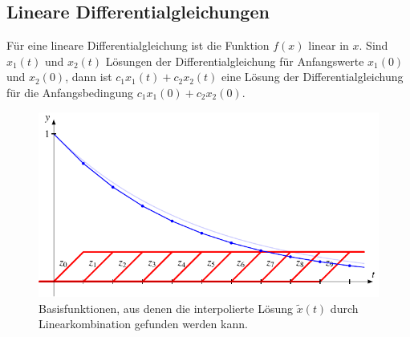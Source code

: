 %
%
%
\subsection{Lineare Differentialgleichungen\label{subsection:lindgl}}
Für eine lineare Differentialgleichung ist die Funktion $f(x)$ linear
in $x$.
Sind $x_1(t)$ und $x_2(t)$ Lösungen der Differentialgleichung
für Anfangswerte $x_1(0)$ und $x_2(0)$, dann ist
$c_1x_1(t)+c_2x_2(t)$ eine Lösung der Differentialgleichung für die
Anfangsbedingung $c_1x_1(0)+c_2x_2(0)$.

\begin{figure}
\centering
\includegraphics{chapters/3/slopes.pdf}
\caption{Basisfunktionen, aus denen die interpolierte Lösung $\tilde{x}(t)$
durch Linearkombination gefunden werden kann.
\label{skript:elemente:slopes}}
\end{figure}

